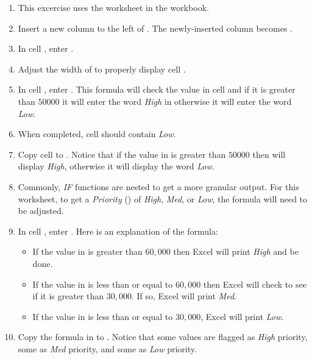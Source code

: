 \begin{enumerate}
	\item This excercise uses the  worksheet in the  workbook.
	\item Insert a new column to the left of . The newly-inserted column becomes .
	\item In cell , enter .
	\item Adjust the width of  to properly display cell .
	\item In cell , enter . This formula will check the value in cell  and if it is greater than $ 50000 $ it will enter the word \textit{High} in  otherwise it will enter the word \textit{Low}.
	\item When completed, cell  should contain \textit{Low}.
	\item Copy cell  to . Notice that if the value in  is greater than $ 50000 $ then  will display \textit{High}, otherwise it will display the word \textit{Low}.
	\item Commonly, \textit{IF} functions are nested to get a more granular output. For this worksheet, to get a \textit{Priority} () of \textit{High}, \textit{Med}, or \textit{Low}, the formula will need to be adjusted.
	\item In cell , enter . Here is an explanation of the formula:
	
	\begin{itemize}
		\item If the value in  is greater than $ 60,000 $ then Excel will print \textit{High} and be done.
		\item If the value in  is less than or equal to $ 60,000 $ then Excel will check to see if it is greater than $ 30,000 $. If so, Excel will print \textit{Med}.
		\item If the value in  is less than or equal to $ 30,000 $, Excel will print \textit{Low}.
	\end{itemize}

	\item Copy the formula in  to . Notice that some values are flagged as \textit{High} priority, some as \textit{Med} priority, and some as \textit{Low} priority.
	

\end{enumerate}
